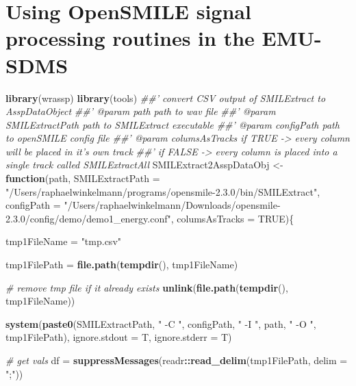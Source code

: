 \documentclass[]{book}
\newenvironment{Shaded}{\begin{snugshade}}{\end{snugshade}}
\newcommand{\CommentTok}[1]{\textcolor[rgb]{0.56,0.35,0.01}{\textit{#1}}}
\newcommand{\ControlFlowTok}[1]{\textcolor[rgb]{0.13,0.29,0.53}{\textbf{#1}}}
\newcommand{\DataTypeTok}[1]{\textcolor[rgb]{0.13,0.29,0.53}{#1}}
\newcommand{\KeywordTok}[1]{\textcolor[rgb]{0.13,0.29,0.53}{\textbf{#1}}}
\newcommand{\NormalTok}[1]{#1}
\newcommand{\OperatorTok}[1]{\textcolor[rgb]{0.81,0.36,0.00}{\textbf{#1}}}
\newcommand{\OtherTok}[1]{\textcolor[rgb]{0.56,0.35,0.01}{#1}}
\newcommand{\StringTok}[1]{\textcolor[rgb]{0.31,0.60,0.02}{#1}}
\begin{document}
\hypertarget{sec:app-chap-wrassp-opensmileSigProc}{%
\section{Using OpenSMILE signal processing routines in the EMU-SDMS}\label{sec:app-chap-wrassp-opensmileSigProc}}

\begin{Shaded}
\begin{Highlighting}[]
\KeywordTok{library}\NormalTok{(wrassp)}
\KeywordTok{library}\NormalTok{(tools)}
\CommentTok{##' convert CSV output of SMILExtract to AsspDataObject}
\CommentTok{##' @param path path to wav file}
\CommentTok{##' @param SMILExtractPath path to SMILExtract executable}
\CommentTok{##' @param configPath path to openSMILE config file}
\CommentTok{##' @param columsAsTracks if TRUE -> every column will be placed in it's own track}
\CommentTok{##' if FALSE -> every column is placed into a single track called SMILExtractAll}
\NormalTok{SMILExtract2AsspDataObj <-}\StringTok{ }\ControlFlowTok{function}\NormalTok{(path,}
                                    \DataTypeTok{SMILExtractPath =} \StringTok{"/Users/raphaelwinkelmann/programs/opensmile-2.3.0/bin/SMILExtract"}\NormalTok{,}
                                    \DataTypeTok{configPath =} \StringTok{"/Users/raphaelwinkelmann/Downloads/opensmile-2.3.0/config/demo/demo1_energy.conf"}\NormalTok{,}
                                    \DataTypeTok{columsAsTracks =} \OtherTok{TRUE}\NormalTok{)\{}
  
\NormalTok{  tmp1FileName =}\StringTok{ "tmp.csv"}
  
\NormalTok{  tmp1FilePath =}\StringTok{ }\KeywordTok{file.path}\NormalTok{(}\KeywordTok{tempdir}\NormalTok{(), tmp1FileName)}
  
  \CommentTok{# remove tmp file if it already exists}
  \KeywordTok{unlink}\NormalTok{(}\KeywordTok{file.path}\NormalTok{(}\KeywordTok{tempdir}\NormalTok{(), tmp1FileName))}
  
  \KeywordTok{system}\NormalTok{(}\KeywordTok{paste0}\NormalTok{(SMILExtractPath, }
                \StringTok{" -C "}\NormalTok{, configPath,}
                \StringTok{" -I "}\NormalTok{, path,}
                \StringTok{" -O "}\NormalTok{, tmp1FilePath), }
         \DataTypeTok{ignore.stdout =}\NormalTok{ T, }
         \DataTypeTok{ignore.stderr =}\NormalTok{ T)}
  
  \CommentTok{# get vals}
\NormalTok{  df =}\StringTok{ }\KeywordTok{suppressMessages}\NormalTok{(readr}\OperatorTok{::}\KeywordTok{read_delim}\NormalTok{(tmp1FilePath, }
                                          \DataTypeTok{delim =} \StringTok{";"}\NormalTok{))}
  

\end{Highlighting}
\end{Shaded}
\end{document}
